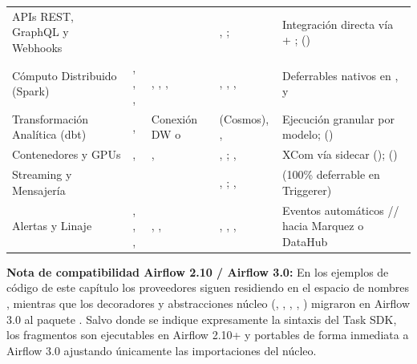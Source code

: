 \begin{table}[htbp]
\begin{tabularx}{\textwidth}{@{}L{2.25cm} L{3.15cm} L{2.05cm} L{4.25cm} Y@{}}
APIs REST, GraphQL y Webhooks &
 &
 &
, ;  &
Integración directa vía  + ;  () \\
Cómputo Distribuido (Spark) &
, , ,  &
, , ,  &
, , ,  &
Deferrables nativos en ,  y  \\
Transformación Analítica (dbt) &
,  &
Conexión DW o  &
 (Cosmos), ,  &
Ejecución granular por modelo;  () \\
Contenedores y GPUs &
,  &
,  &
, ; ,  &
XCom vía sidecar ();  () \\
Streaming y Mensajería &
 &
 &
, ; ,  &
 (100\% deferrable en Triggerer) \\
Alertas y Linaje &
, , ,  &
, ,  &
, , ,  &
Eventos automáticos // hacia Marquez o DataHub \\
\bottomrule
\end{tabularx}
\end{table}

\noindent\textbf{Nota de compatibilidad Airflow 2.10 / Airflow 3.0:} En los ejemplos de código de este capítulo los proveedores siguen residiendo en el espacio de nombres , mientras que los decoradores y abstracciones núcleo (, , , , ) migraron en Airflow 3.0 al paquete  . Salvo donde se indique expresamente la sintaxis del Task SDK, los fragmentos son ejecutables en Airflow 2.10+ y portables de forma inmediata a Airflow 3.0 ajustando únicamente las importaciones del núcleo.

